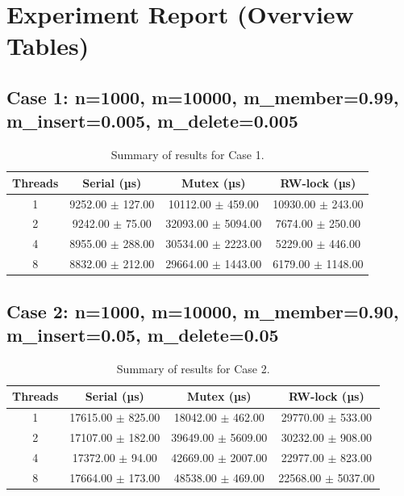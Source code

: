 \documentclass{article}
\begin{document}
\section*{Experiment Report (Overview Tables)}
\subsection*{Case 1: n=1000, m=10000, m\_member=0.99, m\_insert=0.005, m\_delete=0.005}
\begin{table}[h!]
\centering
\begin{tabular}{cccc}
\toprule
\textbf{Threads} & \textbf{Serial (µs)} & \textbf{Mutex (µs)} & \textbf{RW-lock (µs)} \\
\midrule
1 & 9252.00 $\pm$ 127.00 & 10112.00 $\pm$ 459.00 & 10930.00 $\pm$ 243.00 \\
2 & 9242.00 $\pm$ 75.00 & 32093.00 $\pm$ 5094.00 & 7674.00 $\pm$ 250.00 \\
4 & 8955.00 $\pm$ 288.00 & 30534.00 $\pm$ 2223.00 & 5229.00 $\pm$ 446.00 \\
8 & 8832.00 $\pm$ 212.00 & 29664.00 $\pm$ 1443.00 & 6179.00 $\pm$ 1148.00 \\
\bottomrule
\end{tabular}
\caption{Summary of results for Case 1.}
\label{tab:case1}
\end{table}
\subsection*{Case 2: n=1000, m=10000, m\_member=0.90, m\_insert=0.05, m\_delete=0.05}
\begin{table}[h!]
\centering
\begin{tabular}{cccc}
\toprule
\textbf{Threads} & \textbf{Serial (µs)} & \textbf{Mutex (µs)} & \textbf{RW-lock (µs)} \\
\midrule
1 & 17615.00 $\pm$ 825.00 & 18042.00 $\pm$ 462.00 & 29770.00 $\pm$ 533.00 \\
2 & 17107.00 $\pm$ 182.00 & 39649.00 $\pm$ 5609.00 & 30232.00 $\pm$ 908.00 \\
4 & 17372.00 $\pm$ 94.00 & 42669.00 $\pm$ 2007.00 & 22977.00 $\pm$ 823.00 \\
8 & 17664.00 $\pm$ 173.00 & 48538.00 $\pm$ 469.00 & 22568.00 $\pm$ 5037.00 \\
\bottomrule
\end{tabular}
\caption{Summary of results for Case 2.}
\label{tab:case2}
\end{table}
\end{document}
